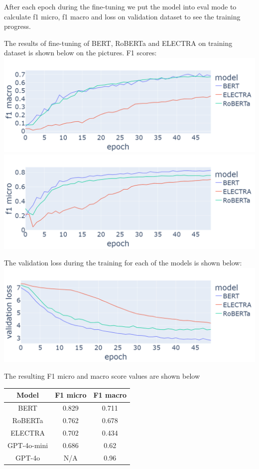 \documentclass[11pt]{article}
\begin{document}
After each epoch during the fine-tuning we put the model into eval mode to calculate f1 micro, f1 macro and loss on validation dataset to see the training progress.

The results of fine-tuning of BERT, RoBERTa and ELECTRA on training dataset is shown below on the pictures. F1 scores:
\includegraphics[scale=0.19]{images/f1scores.png}
\includegraphics[scale=0.19]{images/f1scores_micro.png}

The validation loss during the training for each of the models is shown below:
\includegraphics[scale=0.19]{images/validation_losses.png}

The resulting F1 micro and macro score values are shown below
\begin{table}[h!]
\centering
 \begin{tabular}{c c c} 
 \hline
 Model & F1 micro & F1 macro \\ [0.5ex] 
 \hline
 BERT & 0.829 & 0.711 \\ 
 RoBERTa & 0.762 & 0.678 \\
 ELECTRA & 0.702 & 0.434 \\
 GPT-4o-mini & 0.686 & 0.62 \\
 GPT-4o & N/A & 0.96 \\[1ex]
 \hline
 \end{tabular}
\end{table}
\end{document}
